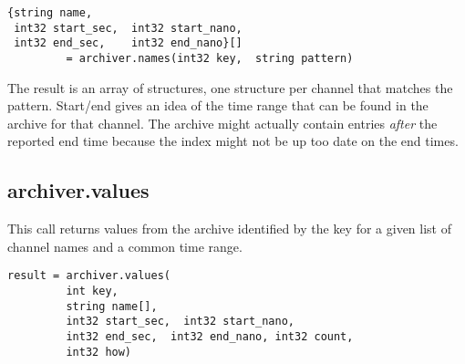 \begin{lstlisting}[keywordstyle=\sffamily]
{string name, 
 int32 start_sec,  int32 start_nano,
 int32 end_sec,    int32 end_nano}[] 
         = archiver.names(int32 key,  string pattern)
\end{lstlisting}

\noindent The result is an array of structures,  one structure
per channel that matches the pattern.
Start/end gives an idea of the time range that can
be found in the archive for that channel.
The archive might actually contain entries \emph{after}
the reported end time because the index might not
be up too date on the end times.

\subsection{archiver.values} \label{sec:archiver:values} %
This call returns values from the archive identified by the key for a
given list of channel names and a common time range.

\begin{lstlisting}[keywordstyle=\sffamily]
result = archiver.values(
         int key, 
         string name[], 
         int32 start_sec,  int32 start_nano,
         int32 end_sec,  int32 end_nano, int32 count,
         int32 how)
\end{lstlisting}

